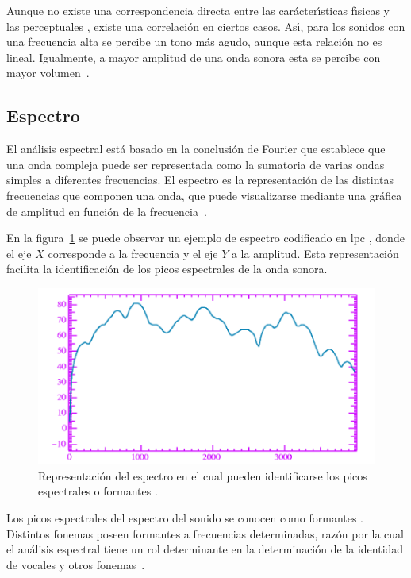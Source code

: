 Aunque no existe una correspondencia directa entre las car\'acter{\'\i}sticas f{\'\i}sicas y las
perceptuales \cite{SematPhysics1958}, existe una correlaci\'on en ciertos casos. As{\'\i}, para los
sonidos con una frecuencia alta se percibe un tono m\'as agudo, aunque esta relaci\'on no es lineal. 
Igualmente, a mayor amplitud de una onda sonora esta se 
percibe con mayor \mbox{volumen \cite{YoungUniversity2007}}.

\subsection{Espectro}
El an\'alisis espectral est\'a basado en la conclusi\'on de Fourier que establece que una onda compleja
puede ser representada como la sumatoria de varias ondas simples a diferentes frecuencias. El espectro es
la representaci\'on de las distintas frecuencias que componen una onda, que puede visualizarse mediante 
una gr\'afica de amplitud en funci\'on de la \mbox{frecuencia \cite{Jurafsky}}. 

En la figura~\ref{figure:formants} se puede observar un ejemplo de espectro codificado
en \gls{lpc} \cite{KesarkarFeature2003}, donde el eje $X$ corresponde a la frecuencia y el eje $Y$ a 
la amplitud. Esta representaci\'on facilita la identificaci\'on de los picos espectrales de la 
onda sonora.

\begin{figure}[H]
\centering
\includegraphics[width=0.6\linewidth]{./graphics/formants.png}
\caption{Representaci\'on del espectro en el cual pueden identificarse los picos espectrales o formantes 
\cite{Jurafsky}.}
\label{figure:formants}
\end{figure}

Los picos espectrales del espectro del sonido se conocen como formantes \cite{Fant1960acoustic}. Distintos fonemas poseen 
formantes a frecuencias determinadas, raz\'on por la cual el an\'alisis espectral tiene un rol determinante en la 
determinaci\'on de la identidad de vocales y otros \mbox{fonemas \cite{LadefogedCourse2006}}.


